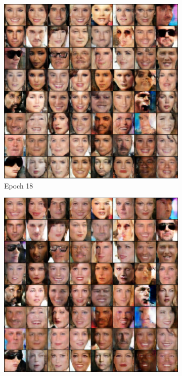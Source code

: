 \begin{figure}[hbt]
    \caption{WGAN-GP trained on CelebA}
    \centering
        \begin{subfigure}[b]{0.3\textwidth}
        \centering
        \includegraphics[width=\textwidth]{chapters/Experiments/Other/wgan_gp_celeba18.png}
        \caption{Epoch 18}
        \end{subfigure}
    \hfill
        \begin{subfigure}[b]{0.3\textwidth}
        \centering
        \includegraphics[width=\textwidth]{chapters/Experiments/Other/wgan_gp_celeba19.png}

\end{subfigure}
\end{figure}
